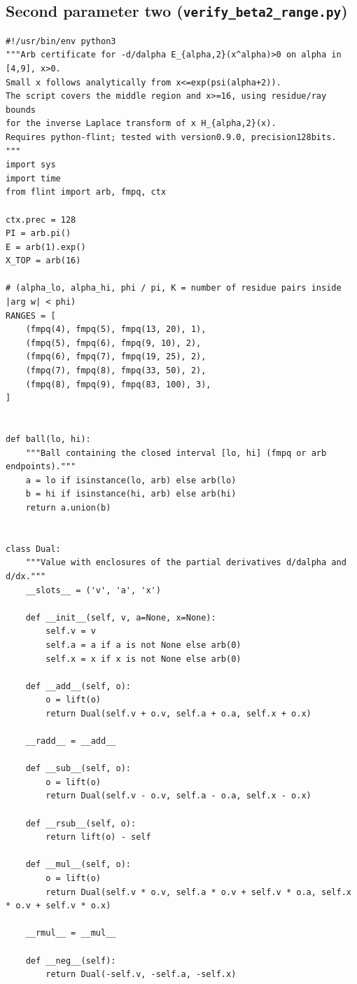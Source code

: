 \documentclass[11pt,a4paper]{article}
\theoremstyle{plain}
\theoremstyle{remark}
\begin{document}
\subsection{Second parameter two (\texttt{verify\_beta2\_range.py})}
\begin{lstlisting}
#!/usr/bin/env python3
"""Arb certificate for -d/dalpha E_{alpha,2}(x^alpha)>0 on alpha in [4,9], x>0.
Small x follows analytically from x<=exp(psi(alpha+2)).
The script covers the middle region and x>=16, using residue/ray bounds
for the inverse Laplace transform of x H_{alpha,2}(x).
Requires python-flint; tested with version0.9.0, precision128bits.
"""
import sys
import time
from flint import arb, fmpq, ctx

ctx.prec = 128
PI = arb.pi()
E = arb(1).exp()
X_TOP = arb(16)

# (alpha_lo, alpha_hi, phi / pi, K = number of residue pairs inside |arg w| < phi)
RANGES = [
    (fmpq(4), fmpq(5), fmpq(13, 20), 1),
    (fmpq(5), fmpq(6), fmpq(9, 10), 2),
    (fmpq(6), fmpq(7), fmpq(19, 25), 2),
    (fmpq(7), fmpq(8), fmpq(33, 50), 2),
    (fmpq(8), fmpq(9), fmpq(83, 100), 3),
]


def ball(lo, hi):
    """Ball containing the closed interval [lo, hi] (fmpq or arb endpoints)."""
    a = lo if isinstance(lo, arb) else arb(lo)
    b = hi if isinstance(hi, arb) else arb(hi)
    return a.union(b)


class Dual:
    """Value with enclosures of the partial derivatives d/dalpha and d/dx."""
    __slots__ = ('v', 'a', 'x')

    def __init__(self, v, a=None, x=None):
        self.v = v
        self.a = a if a is not None else arb(0)
        self.x = x if x is not None else arb(0)

    def __add__(self, o):
        o = lift(o)
        return Dual(self.v + o.v, self.a + o.a, self.x + o.x)

    __radd__ = __add__

    def __sub__(self, o):
        o = lift(o)
        return Dual(self.v - o.v, self.a - o.a, self.x - o.x)

    def __rsub__(self, o):
        return lift(o) - self

    def __mul__(self, o):
        o = lift(o)
        return Dual(self.v * o.v, self.a * o.v + self.v * o.a, self.x * o.v + self.v * o.x)

    __rmul__ = __mul__

    def __neg__(self):
        return Dual(-self.v, -self.a, -self.x)



\end{lstlisting}
\end{document}
